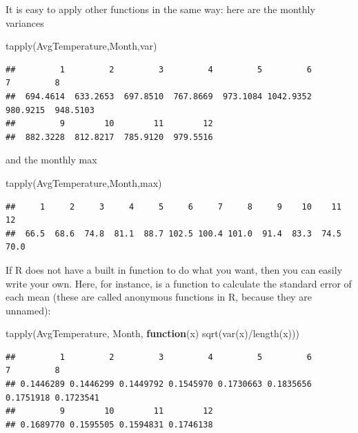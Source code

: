 \documentclass[
]{book}
\newenvironment{Shaded}{\begin{snugshade}}{\end{snugshade}}
\newcommand{\ControlFlowTok}[1]{\textcolor[rgb]{0.13,0.29,0.53}{\textbf{#1}}}
\newcommand{\FunctionTok}[1]{\textcolor[rgb]{0.00,0.00,0.00}{#1}}
\newcommand{\NormalTok}[1]{#1}
\newcommand{\SpecialCharTok}[1]{\textcolor[rgb]{0.00,0.00,0.00}{#1}}
\theoremstyle{definition}
\theoremstyle{definition}
\theoremstyle{definition}
\theoremstyle{definition}
\theoremstyle{remark}
\begin{document}
It is easy to apply other functions in the same way: here are the monthly variances

\begin{Shaded}
\begin{Highlighting}[]
\FunctionTok{tapply}\NormalTok{(AvgTemperature,Month,var)}
\end{Highlighting}
\end{Shaded}

\begin{verbatim}
##         1         2         3         4         5         6         7         8 
##  694.4614  633.2653  697.8510  767.8669  973.1084 1042.9352  980.9215  948.5103 
##         9        10        11        12 
##  882.3228  812.8217  785.9120  979.5516
\end{verbatim}

and the monthly max

\begin{Shaded}
\begin{Highlighting}[]
\FunctionTok{tapply}\NormalTok{(AvgTemperature,Month,max)}
\end{Highlighting}
\end{Shaded}

\begin{verbatim}
##     1     2     3     4     5     6     7     8     9    10    11    12 
##  66.5  68.6  74.8  81.1  88.7 102.5 100.4 101.0  91.4  83.3  74.5  70.0
\end{verbatim}

If R does not have a built in function to do what you want, then you can easily write your own. Here, for instance, is a function to calculate the standard error of each mean (these are called anonymous functions in R, because they are unnamed):

\begin{Shaded}
\begin{Highlighting}[]
\FunctionTok{tapply}\NormalTok{(AvgTemperature, Month,  }\ControlFlowTok{function}\NormalTok{(x) }\FunctionTok{sqrt}\NormalTok{(}\FunctionTok{var}\NormalTok{(x)}\SpecialCharTok{/}\FunctionTok{length}\NormalTok{(x)))}
\end{Highlighting}
\end{Shaded}

\begin{verbatim}
##         1         2         3         4         5         6         7         8 
## 0.1446289 0.1446299 0.1449792 0.1545970 0.1730663 0.1835656 0.1751918 0.1723541 
##         9        10        11        12 
## 0.1689770 0.1595505 0.1594831 0.1746138
\end{verbatim}
\end{document}
